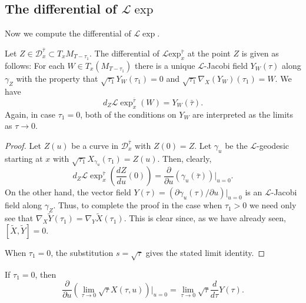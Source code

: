 \subsection{The differential of ${\mathcal L}\exp$}
Now we compute the differential of ${\mathcal L}\exp$.


\begin{lemma}\label{lem:l-exponential-differential}
\label{DLJacobi}

Let $Z\in {\mathcal D}_x^{\bar\tau}\subset T_xM_{T-\tau_1}$. The
differential of ${\mathcal L}\mathrm{exp}^{\bar\tau}_x$
at the point $Z$ is given as follows: For each $W\in
T_x(M_{T-\tau_1})$ there is a unique ${\mathcal L}$-Jacobi
field $Y_W(\tau)$ along
$\gamma_Z$ with the property that $\sqrt{\tau_1}Y_W(\tau_1)=0$ and
$\sqrt{\tau_1}\nabla_X(Y_W)(\tau_1)=W$. We have
$$d_Z{\mathcal L}\exp^{\bar\tau}_x(W)=Y_W(\bar\tau).$$
Again, in case $\tau_1=0$, both of the conditions on $Y_W$ are interpreted as
the limits as $\tau\rightarrow 0$.
\end{lemma}


\begin{proof}
\sketch
{}
Let $Z(u)$ be a curve in ${\mathcal D}_x^{\bar\tau}$ with $Z(0)=Z$.
Let $\gamma_u$ be the ${\mathcal L}$-geodesic starting at $x$ with
$\sqrt{\tau_1}X_{\gamma_u}(\tau_1)=Z(u)$. Then, clearly,
$$d_Z{\mathcal L}\exp^{\bar\tau}_x\left(\frac{dZ}{du}(0)\right)
=\frac{\partial}{\partial u}\left(\gamma_u(\bar\tau)\right)|_{u=0}.$$ On the
other hand, the vector field $Y(\tau)=\left(\partial\gamma_u(\tau)/\partial
u\right)|_{u=0} $ is an ${\mathcal L}$-Jacobi field along $\gamma_Z$.  Thus, to
complete the proof in the case when $\tau_1>0$ we need only see that
$\nabla_X\widetilde Y(\tau_1)=\nabla_Y\widetilde X(\tau_1)$. This is clear
since, as we have already seen, $[\widetilde X,\widetilde Y]=0$.

  When $\tau_1=0$, the substitution $s=\sqrt\tau$ gives the stated
limit identity.
\end{proof}

\begin{claim}\label{claim:l-exp-tau-derivative-limit}
If $\tau_1=0$, then
$$\frac{\partial}{\partial u}\left(\lim_{\tau\rightarrow 0}\sqrt{\tau}X(\tau,u)\right)|_{u=0}=
\lim_{\tau\rightarrow 0}\sqrt{\tau}\frac{d}{d\tau}Y(\tau).$$
\end{claim}

